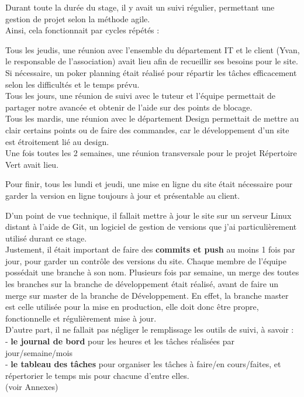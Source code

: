Durant toute la durée du stage, il y avait un suivi régulier, permettant une gestion de projet selon la méthode agile.\\

Ainsi, cela fonctionnait par cycles répétés :

Tous les jeudis, une réunion avec l'ensemble du département IT et le client (Yvan, le responsable de l'association) avait lieu afin de recueillir ses besoins pour le site.\\
Si nécessaire, un poker planning était réalisé pour répartir les tâches efficacement selon les difficultés et le temps prévu.\\

Tous les jours, une réunion de suivi avec le tuteur et l'équipe permettait de partager notre avancée et obtenir de l'aide sur des points de blocage.\\

Tous les mardis, une réunion avec le département Design permettait de mettre au clair certains points ou de faire des commandes, car le développement d'un site est étroitement lié au design.\\

Une fois toutes les 2 semaines, une réunion transversale pour le projet Répertoire Vert avait lieu.

Pour finir, tous les lundi et jeudi, une mise en ligne du site était nécessaire pour garder la version en ligne toujours à jour et présentable au client.

D'un point de vue technique, il fallait mettre à jour le site sur un serveur Linux distant à l'aide de Git, un logiciel de gestion de versions que j'ai particulièrement utilisé durant ce stage. \\

Justement, il était important de faire des \textbf{commits et push} au moins 1 fois par jour, pour garder un contrôle des versions du site.
Chaque membre de l'équipe possédait une branche à son nom. Plusieurs fois par semaine, un merge des toutes les branches sur la branche de développement était réalisé, avant de faire un merge sur master de la branche de Développement.
En effet, la branche master est celle utilisée pour la mise en production, elle doit donc être propre, fonctionnelle et régulièrement mise à jour. \\

D'autre part, il ne fallait pas négliger le remplissage les outils de suivi, à savoir : \\
- \textbf{le journal de bord} pour les heures et les tâches réalisées par jour/semaine/mois\\ 
- \textbf{le tableau des tâches} pour organiser les tâches à faire/en cours/faites, et répertorier le temps mis pour chacune d'entre elles.\\
(voir Annexes)\\

